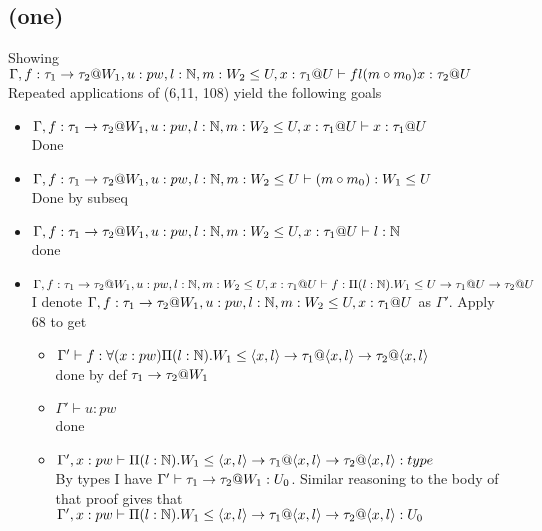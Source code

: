 \documentclass{article}
\begin{document}
\subsection*{(one)}
Showing $\Gamma,f:\tau_1\rightarrow\tau_2@W_1,u:pw,l:\mathbb{N},m:W_2\leq U,x:\tau_1@U\vdash fl(m\circ m_0)x:\tau_2@U$ \\
Repeated applications of (6,11, 108) yield the following goals
\begin{itemize}
    \item $\Gamma,f:\tau_1\rightarrow\tau_2@W_1,u:pw,l:\mathbb{N},m:W_2\leq U,x:\tau_1@U\vdash x:\tau_1@U$\\
    Done
    \item  $\Gamma,f:\tau_1\rightarrow\tau_2@W_1,u:pw,l:\mathbb{N},m:W_2\leq U \vdash (m \circ m_0):W_1\leq U$\\
    Done by subseq
    \item $\Gamma,f:\tau_1\rightarrow\tau_2@W_1,u:pw,l:\mathbb{N},m:W_2\leq U,x:\tau_1@U\vdash l : \mathbb{N}$\\
    done
    \item $\Gamma,f:\tau_1\rightarrow\tau_2@W_1,u:pw,l:\mathbb{N},m:W_2\leq U,x:\tau_1@U\vdash f: \Pi(l:\mathbb{N}).W_1 \leq U \rightarrow \tau_1@U \rightarrow \tau_2@U$\\
    I denote $\Gamma,f:\tau_1\rightarrow\tau_2@W_1,u:pw,l:\mathbb{N},m:W_2\leq U,x:\tau_1@U$ as $\Gamma'$.
    Apply 68 to get
    \begin{itemize}
    \item $\Gamma' \vdash f: \forall(x:pw)\Pi(l:\mathbb{N}).W_1 \leq  \langle x, l \rangle \rightarrow \tau_1@ \langle x, l \rangle \rightarrow \tau_2@ \langle x, l \rangle$\\
    done by def $\tau_1\rightarrow\tau_2@W_1$
        \item $\Gamma' \vdash u : pw$\\
        done
        \item $\Gamma', x: pw \vdash \Pi(l:\mathbb{N}).W_1 \leq \langle x, l \rangle \rightarrow \tau_1@ \langle x, l \rangle \rightarrow \tau_2@ \langle x, l \rangle : type$\\
        By types I have $\Gamma' \vdash \tau_1 \rightarrow \tau_2@W_1 : U_0$. Similar reasoning to the body of that proof gives that 
        $\Gamma', x: pw \vdash \Pi(l:\mathbb{N}).W_1 \leq \langle x, l \rangle \rightarrow \tau_1@ \langle x, l \rangle \rightarrow \tau_2@ \langle x, l \rangle : U_0$
    \end{itemize}
\end{itemize}
\end{document}
